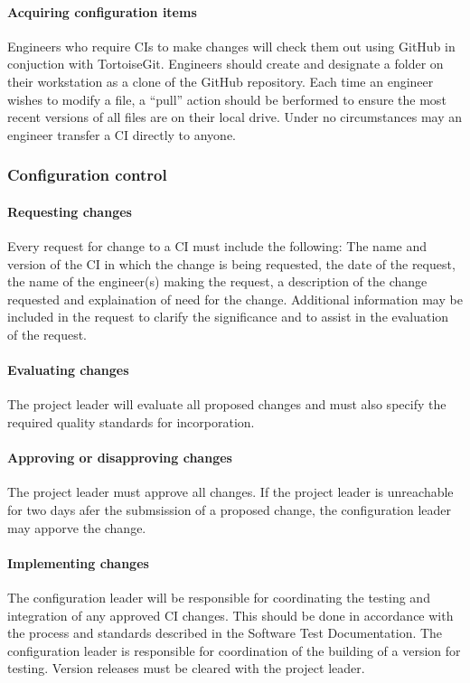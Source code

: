 \documentclass{scrartcl}
\begin{document}
\paragraph{Acquiring configuration items}
Engineers who require CIs to make changes will check them out using GitHub in conjuction with TortoiseGit.
Engineers should create and designate a folder on their workstation as a clone of the GitHub repository.  Each time an engineer wishes to modify a file, a ``pull'' action should be berformed to ensure the most recent versions of all files are on their local drive.  Under no circumstances may an engineer transfer a CI directly to anyone.

\subsubsection{Configuration control}
\paragraph{Requesting changes}
Every request for change to a CI must include the following: The name and version of the CI in which the change is being requested,  the date of the request, the name of the engineer(s) making the request, a description of the change requested and explaination of need for the change.  Additional information may be included in the request to clarify the significance and to assist in the evaluation of the request.

\paragraph{Evaluating changes}
The project leader will evaluate all proposed changes and must also specify the required quality standards for incorporation.
\paragraph{Approving or disapproving changes}
The project leader must approve all changes.  If the project leader is unreachable for two days afer the submsission of a proposed change, the configuration leader may apporve the change.
\paragraph{Implementing changes}
The configuration leader will be responsible for coordinating the testing and integration of any approved CI changes.  This should be done in accordance with the process  and standards described in the Software Test Documentation.  The configuration leader is responsible for coordination of the building of a version for testing.  Version releases must be cleared with the project leader.
\end{document}
